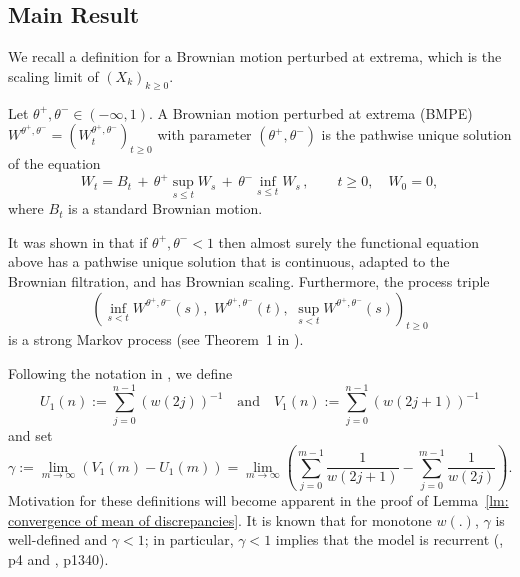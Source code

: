 \documentclass[EJP]{ejpecp} %
\begin{document}




\subsection{Main Result}
We recall a definition for a Brownian motion perturbed at extrema, which is the scaling limit of $(X_k)_{k\geq 0}$.
\begin{definition}
	\label{defn:BMPE}
	Let $\theta^+, \theta^- \in (- \infty , 1)$. A Brownian motion perturbed at
	extrema (BMPE) $W^{\theta^+, \theta^-} = \left(W^{\theta^+, \theta^-}_t\right)_{t\geq 0}$ with parameter $(\theta^+, \theta^-)$ is the pathwise unique solution of the equation
	\[
	W_t = B_t \,+\, \theta^+ \sup_{s\leq t} W_s  \,+\, \theta^- \inf_{s\leq t} W_s \,,   \qquad t \ge 0, \quad W_0 = 0,
	\]
	where $B_t$ is a standard Brownian motion.
\end{definition}
It was shown in \cite{PW97, CD99} that if $\theta^+, \theta^- < 1$ then almost surely the functional equation above has a pathwise unique solution that is continuous, adapted to the Brownian filtration, and has Brownian scaling. 
Furthermore, the process triple 
\[
	\left(\inf_{s < t} W^{\theta^{+}, \theta^{-}}(s), \,\,
	W^{\theta^{+}, \theta^{-}}(t) , \,\,
	\sup _{s<t} W^{\theta^{+}, \theta^{-}}(s)\right)_{t \geq 0}
\]
is a strong Markov process (see Theorem~1 in \cite{PW97}).

Following the notation in \cite{T96}, we define
\[
U_1(n):=\sum_{j=0}^{n-1}(w(2 j))^{-1} \quad \text{and} \quad
V_1(n):=\sum_{j=0}^{n-1}(w(2 j+1))^{-1}
\]
and set
\begin{equation}
	\label{eq: gamma}
	\gamma:= \lim_{m\to \infty}\left( V_1(m) - U_1(m) \right) =\lim_{m\to \infty} \left( \sum_{j=0}^{m-1} \frac{1}{ w(2j+1)}-  \sum_{j=0}^{m-1}  \frac{1}{w(2j)} \right) 
	.\end{equation}
Motivation for these definitions will become apparent in the proof of Lemma~\ref{lm: convergence of mean of discrepancies}.
It is known that for monotone $w(.)$, $\gamma$
is well-defined and ${\gamma<1}$; in particular, $\gamma<1$ implies that the model is recurrent (\cite{KMP23}, p4 and \cite{T96}, p1340). 
 
\end{document}
